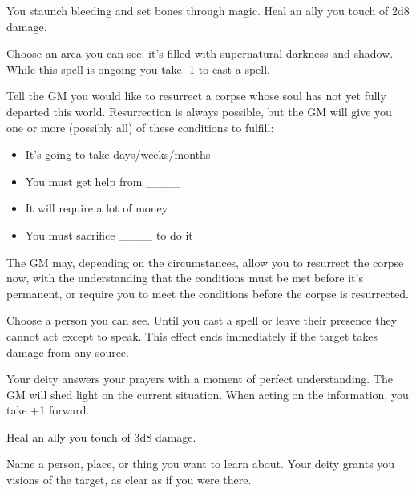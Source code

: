 

 You staunch bleeding and set bones through magic. Heal an ally you touch of 2d8 damage.





 Choose an area you can see: it's filled with supernatural darkness and shadow. While this spell is ongoing you take -1 to cast a spell.




 Tell the GM you would like to resurrect a corpse whose soul has not yet fully departed this world. Resurrection is always possible, but the GM will give you one or more (possibly all) of these conditions to fulfill:
\begin{itemize}
\item It's going to take days/weeks/months
\item You must get help from \_\_\_\_
\item It will require a lot of money
\item You must sacrifice \_\_\_\_ to do it

\end{itemize}


 The GM may, depending on the circumstances, allow you to resurrect the corpse now, with the understanding that the conditions must be met before it's permanent, or require you to meet the conditions before the corpse is resurrected.




 Choose a person you can see. Until you cast a spell or leave their presence they cannot act except to speak. This effect ends immediately if the target takes damage from any source.




 Your deity answers your prayers with a moment of perfect understanding. The GM will shed light on the current situation. When acting on the information, you take +1 forward.




 Heal an ally you touch of 3d8 damage.




 Name a person, place, or thing you want to learn about. Your deity grants you visions of the target, as clear as if you were there.





